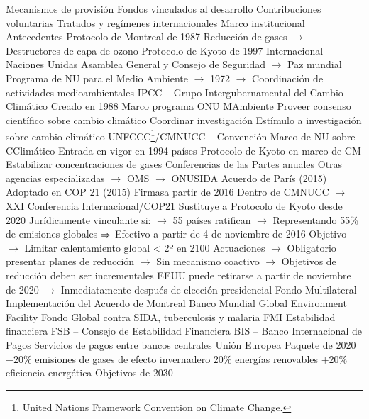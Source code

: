 \documentclass{nuevotema}
\begin{document}
\begin{esquemal}
			\3 Mecanismos de provisión
				\4 Fondos vinculados al desarrollo
				\4 Contribuciones voluntarias
				\4 Tratados y regímenes internacionales
		\2 Marco institucional
			\3 Antecedentes
				\4 Protocolo de Montreal de 1987
				\4[] Reducción de gases
				\4[] $\to$ Destructores de capa de ozono
				\4 Protocolo de Kyoto de 1997
			\3 Internacional
				\4 Naciones Unidas
				\4[] Asamblea General y Consejo de Seguridad
				\4[] $\to$ Paz mundial
				\4[] Programa de NU para el Medio Ambiente
				\4[] $\to$ 1972
				\4[] $\to$ Coordinación de actividades medioambientales
				\4 IPCC -- Grupo Intergubernamental del Cambio Climático
				\4[] Creado en 1988
				\4[] Marco programa ONU MAmbiente
				\4[] Proveer consenso científico sobre cambio climático
				\4[] Coordinar investigación
				\4[] Estímulo a investigación sobre cambio climático
				\4 UNFCCC\footnote{United Nations Framework Convention on Climate Change.}/CMNUCC -- Convención Marco de NU sobre CClimático
				\4[]  Entrada en vigor en 1994
				 países
				\4[] Protocolo de Kyoto en marco de CM
				\4[] Estabilizar concentraciones de gases
				\4[] Conferencias de las Partes anuales
				\4[] Otras agencias especializadas
				\4[] $\to$ OMS
				\4[] $\to$ ONUSIDA
				\4 Acuerdo de París (2015)
				\4[] Adoptado en COP 21 (2015)
				\4[] Firmasa partir de 2016
				\4[] Dentro de CMNUCC
				\4[] $\to$ XXI Conferencia Internacional/COP21
				\4[] Sustituye a Protocolo de Kyoto desde 2020
				\4[] Jurídicamente vinculante si:
				\4[] $\to$ 55 países ratifican
				\4[] $\to$ Representando 55\% de emisiones globales
				\4[] $\Rightarrow$ Efectivo a partir de 4 de noviembre de 2016
				\4[] Objetivo
				\4[] $\to$ Limitar calentamiento global < 2º en 2100
				\4[] Actuaciones
				\4[] $\to$ Obligatorio presentar planes de reducción
				\4[] $\to$ Sin mecanismo coactivo
				\4[] $\to$ Objetivos de reducción deben ser incrementales
				\4[] EEUU puede retirarse a partir de noviembre de 2020
				\4[] $\to$ Inmediatamente después de elección presidencial
				\4 Fondo Multilateral
				\4[] Implementación del Acuerdo de Montreal
				\4 Banco Mundial
				\4[] Global Environment Facility
				\4[] Fondo Global contra SIDA, tuberculosis y malaria
				\4 FMI
				\4[] Estabilidad financiera
				\4 FSB -- Consejo de Estabilidad Financiera
				\4 BIS -- Banco Internacional de Pagos
				\4[] Servicios de pagos entre bancos centrales
			\3 Unión Europea
				\4 Paquete de 2020
				\4[] $-20\%$ emisiones de gases de efecto invernadero
				\4[] $20\%$ energías renovables
				\4[] $+20\%$ eficiencia energética
				\4 Objetivos de 2030

\end{esquemal}
\end{document}
